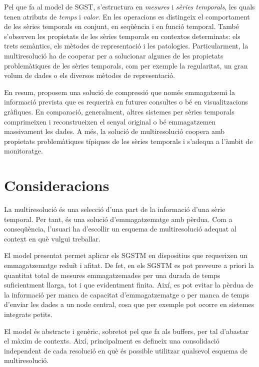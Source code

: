 Pel que fa al model de \gls{SGST}, s'estructura en \emph{mesures} i
\emph{sèries temporals}, les quals tenen atributs de \emph{temps} i
\emph{valor}. En les operacions es distingeix el comportament de les
sèries temporals en conjunt, en seqüència i en funció temporal.  També
s'observen les propietats de les sèries temporals en contextos
determinats: els trets semàntics, els mètodes de representació i les
patologies.  Particularment, la multiresolució ha de cooperar per a
solucionar algunes de les propietats problemàtiques de les sèries
temporals, com per exemple la regularitat, un gran volum de dades o
els diversos mètodes de representació.


En resum, proposem una solució de compressió que només emmagatzemi la
informació prevista que es requerirà en futures consultes o bé en
visualitzacions gràfiques.  En comparació, generalment, altres
sistemes per sèries temporals comprimeixen i reconstrueixen el senyal
original o bé emmagatzemen massivament les dades. A més, la solució de
multiresolució coopera amb propietats problemàtiques típiques de les
sèries temporals i s'adequa a l'àmbit de monitoratge.




\section{Consideracions}

La multiresolució és una selecció d'una part de la informació d'una
sèrie temporal. Per tant, és una solució d'emmagatzematge amb
pèrdua. Com a conseqüència, l'usuari ha d'escollir un esquema de
multiresolució adequat al context en què vulgui treballar.



El model presentat permet aplicar els \gls{SGSTM} en dispositius que
requerixen un emmagatzematge reduït i afitat. De fet, en els
\gls{SGSTM} es pot preveure a priori la quantitat total de mesures
emmagatzemades per una durada de temps suficientment llarga, tot i que
evidentment finita. Així, es pot evitar la pèrdua de la informació per
manca de capacitat d'emmagatzematge o per manca de temps d'enviar les
dades a un node central, cosa que per exemple pot ocorre en sistemes
integrats petits.


El model és abstracte i genèric, sobretot pel que fa als buffers, per
tal d'abastar el màxim de contexts. Així, principalment es defineix
una consolidació independent de cada resolució en què és possible
utilitzar qualsevol esquema de multiresolució.




